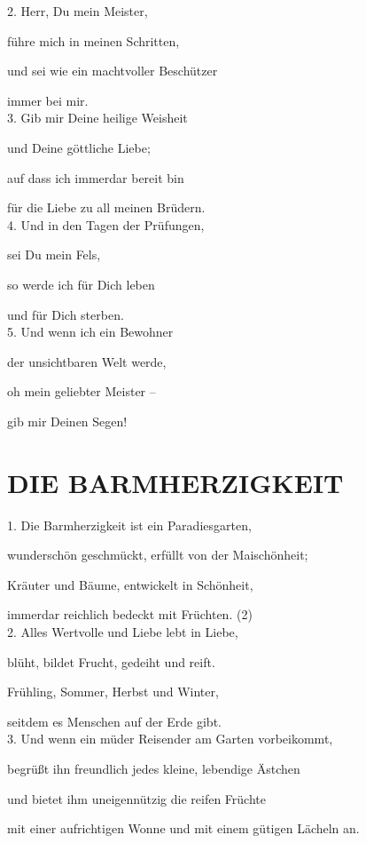 \documentclass[11pt,a5paper,twoside]{article}
\begin{document}
2. Herr, Du mein Meister, 

führe mich in meinen Schritten, 

und sei wie ein machtvoller Beschützer 

immer bei mir.\\

3. Gib mir Deine heilige Weisheit

und Deine göttliche Liebe;

auf dass ich immerdar bereit bin

für die Liebe zu all meinen Brüdern.\\


4. Und in den Tagen der Prüfungen, 

sei Du mein Fels,

so werde ich für Dich leben

und für Dich sterben.\\

5. Und wenn ich ein Bewohner 

der unsichtbaren Welt werde, 

oh mein geliebter Meister --

gib mir Deinen Segen!



\section[Die Barmherzigkeit]{DIE BARMHERZIGKEIT}

1. Die Barmherzigkeit ist ein Paradiesgarten,

wunderschön geschmückt, erfüllt von der Maischönheit; 

Kräuter und Bäume, entwickelt in Schönheit,

immerdar reichlich bedeckt mit Früchten. (2) \\

2. Alles Wertvolle und Liebe lebt in Liebe, 

blüht, bildet Frucht, gedeiht und reift.

Frühling, Sommer, Herbst und Winter, 

seitdem es Menschen auf der Erde gibt.\\

3. Und wenn ein müder Reisender am Garten vorbeikommt,

begrüßt ihn freundlich jedes kleine, lebendige Ästchen 

und bietet ihm uneigennützig die reifen Früchte

mit einer aufrichtigen Wonne und mit einem gütigen Lächeln an.\\
\end{document}
